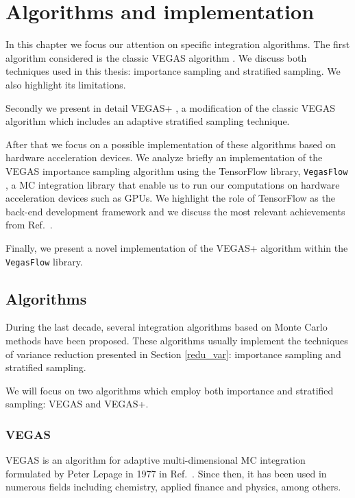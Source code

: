 \documentclass[../main/main.tex]{subfiles}
\begin{document}
\chapter[Algorithms and implementation]{Algorithms and implementation}
In this chapter we focus our attention on specific integration algorithms. 
The first algorithm considered is the classic VEGAS algorithm \cite{Lepage:1977sw}. We discuss both techniques used in this thesis: importance sampling and stratified sampling. We also highlight its limitations.

Secondly we present in detail VEGAS+ \cite{Lepage:2020tgj}, a modification of the classic VEGAS algorithm which includes an adaptive stratified sampling technique.

After that we focus on a possible implementation of these algorithms based on hardware acceleration devices.
We analyze briefly an implementation of the VEGAS importance sampling algorithm using the TensorFlow library, \texttt{VegasFlow} \cite{Carrazza:2020rdn}, a MC integration library that enable us to run our computations on hardware acceleration devices such as GPUs. We highlight the role of TensorFlow as the back-end development framework and we discuss the most relevant achievements from Ref.~\cite{Carrazza:2020rdn}.

Finally, we present a novel implementation of the VEGAS+ algorithm within the \texttt{VegasFlow} library. 

 
	
\section{Algorithms}
During the last decade, several integration algorithms based on Monte Carlo methods have been proposed.
These algorithms usually implement the techniques of variance reduction presented in Section \ref{redu_var}: importance sampling and stratified sampling.

We will focus on two algorithms which employ both importance and stratified sampling: VEGAS and VEGAS+.

\subsection{VEGAS}
\label{vegas}
VEGAS is an algorithm for adaptive multi-dimensional MC integration formulated by Peter Lepage in 1977 in Ref.~\cite{Lepage:1977sw}.
Since then, it has been used in numerous fields including chemistry, applied finance and physics, among others.
\end{document}
